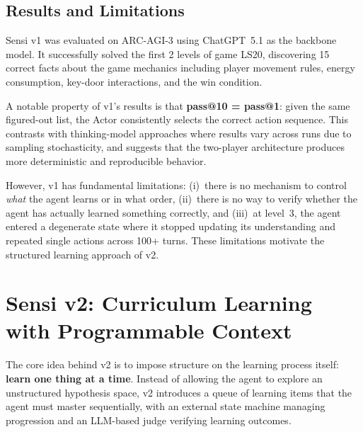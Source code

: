 \documentclass[11pt,letterpaper]{article}
\begin{document}
\subsection{Results and Limitations}

Sensi v1 was evaluated on ARC-AGI-3 using ChatGPT~5.1 as the backbone model. It successfully solved the first 2 levels of game LS20, discovering 15 correct facts about the game mechanics including player movement rules, energy consumption, key-door interactions, and the win condition.

A notable property of v1's results is that \textbf{pass@10 = pass@1}: given the same figured-out list, the Actor consistently selects the correct action sequence. This contrasts with thinking-model approaches where results vary across runs due to sampling stochasticity, and suggests that the two-player architecture produces more deterministic and reproducible behavior.

However, v1 has fundamental limitations: (i)~there is no mechanism to control \emph{what} the agent learns or in what order, (ii)~there is no way to verify whether the agent has actually learned something correctly, and (iii)~at level~3, the agent entered a degenerate state where it stopped updating its understanding and repeated single actions across 100+ turns. These limitations motivate the structured learning approach of v2.


\section{Sensi v2: Curriculum Learning with Programmable Context}
\label{sec:v2}

The core idea behind v2 is to impose structure on the learning process itself: \textbf{learn one thing at a time}. Instead of allowing the agent to explore an unstructured hypothesis space, v2 introduces a queue of learning items that the agent must master sequentially, with an external state machine managing progression and an LLM-based judge verifying learning outcomes.
\end{document}
